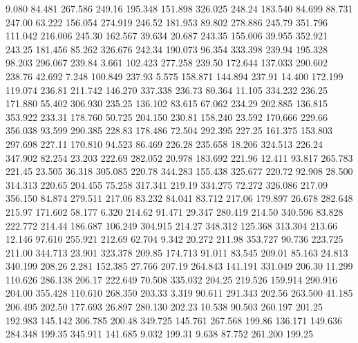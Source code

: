    9.080   84.481  267.586       249.16
 195.348  151.898  326.025       248.24
 183.540   84.699   88.731       247.00
  63.222  156.054  274.919       246.52
 181.953   89.802  278.886       245.79
 351.796  111.042  216.006       245.30
 162.567   39.634   20.687       243.35
 155.006   39.955  352.921       243.25
 181.456   85.262  326.676       242.34
 190.073   96.354  333.398       239.94
 195.328   98.203  296.067       239.84
   3.661  102.423  277.258       239.50
 172.644  137.033  290.602       238.76
  42.692    7.248  100.849       237.93
   5.575  158.871  144.894       237.91
  14.400  172.199  119.074       236.81
 211.742  146.270  337.338       236.73
  80.364   11.105  334.232       236.25
 171.880   55.402  306.930       235.25
 136.102   83.615   67.062       234.29
 202.885  136.815  353.922       233.31
 178.760   50.725  204.150       230.81
 158.240   23.592  170.666       229.66
 356.038   93.599  290.385       228.83
 178.486   72.504  292.395       227.25
 161.375  153.803  297.698       227.11
 170.810   94.523   86.469       226.28
 235.658   18.206  324.513       226.24
 347.902   82.254   23.203       222.69
 282.052   20.978  183.692       221.96
  12.411   93.817  265.783       221.45
  23.505   36.318  305.085       220.78
 344.283  155.438  325.677       220.72
  92.908   28.500  314.313       220.65
 204.455   75.258  317.341       219.19
 334.275   72.272  326.086       217.09
 356.150   84.874  279.511       217.06
  83.232   84.041   83.712       217.06
 179.897   26.678  282.648       215.97
 171.602   58.177    6.320       214.62
  91.471   29.347  280.419       214.50
 340.596   83.828  222.772       214.44
 186.687  106.249  304.915       214.27
 348.312  125.368  313.304       213.66
  12.146   97.610  255.921       212.69
  62.704    9.342   20.272       211.98
 353.727   90.736  223.725       211.00
 344.713   23.901  323.378       209.85
 174.713   91.011   83.545       209.01
  85.163   24.813  340.199       208.26
   2.281  152.385   27.766       207.19
 264.843  141.191  331.049       206.30
  11.299  110.626  286.138       206.17
 222.649   70.508  335.032       204.25
 219.526  159.914  290.916       204.00
 355.428  110.610  268.350       203.33
   3.319   90.611  291.343       202.56
 263.500   41.185  206.495       202.50
 177.693   26.897  280.130       202.23
  10.538   90.503  260.197       201.25
 192.983  145.142  306.785       200.48
 349.725  145.761  267.568       199.86
 136.171  149.636  284.348       199.35
 345.911  141.685    9.032       199.31
   9.638   87.752  261.200       199.25
